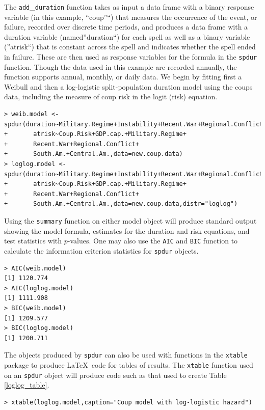 \documentclass[]{article}
\begin{document}
\normalsize
The \texttt{add}\_\texttt{duration} function takes as input a data frame
with a binary response variable (in this example, ``coup''``) that
measures the occurrence of the event, or failure, recorded over discrete
time periods, and produces a data frame with a duration variable
(named''duration``) for each spell as well as a binary variable
(''atrisk``) that is constant across the spell and indicates whether the
spell ended in failure. These are then used as response variables for
the formula in the \texttt{spdur} function. Though the data used in this
example are recorded annually, the function supports annual, monthly, or
daily data. We begin by fitting first a Weibull and then a log-logistic
split-population duration model using the coups data, including the
measure of coup risk in the logit (risk) equation. \small

\begin{verbatim}
> weib.model <- spdur(duration~Military.Regime+Instability+Recent.War+Regional.Conflict,
+       atrisk~Coup.Risk+GDP.cap.+Military.Regime+
+       Recent.War+Regional.Conflict+
+       South.Am.+Central.Am.,data=new.coup.data)
> loglog.model <- spdur(duration~Military.Regime+Instability+Recent.War+Regional.Conflict,
+       atrisk~Coup.Risk+GDP.cap.+Military.Regime+
+       Recent.War+Regional.Conflict+
+       South.Am.+Central.Am.,data=new.coup.data,distr="loglog")
\end{verbatim}

\normalsize  
Using the \texttt{summary} function on either model object will produce
standard output showing the model formula, estimates for the duration
and risk equations, and test statistics with \(p\)-values. One may also
use the \texttt{AIC} and \texttt{BIC} function to calculate the
information criterion statistics for \texttt{spdur} objects.\\\small

\begin{verbatim}
> AIC(weib.model)
[1] 1120.774
> AIC(loglog.model)
[1] 1111.908
> BIC(weib.model)
[1] 1209.577
> BIC(loglog.model)
[1] 1200.711
\end{verbatim}

\normalsize
The objects produced by \texttt{spdur} can also be used with functions
in the \texttt{xtable} package to produce \LaTeX~code for tables of
results. The \texttt{xtable} function used on an \texttt{spdur} object
will produce code such as that used to create Table \ref{loglog_table}.
\small

\begin{verbatim}
> xtable(loglog.model,caption="Coup model with log-logistic hazard")
\end{verbatim}
\end{document}
